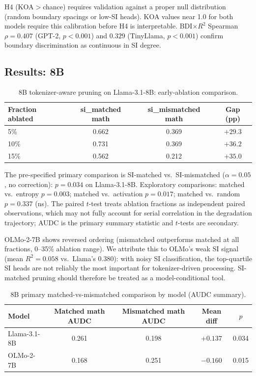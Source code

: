 \documentclass{article}
\begin{document}
H4 (KOA$>$chance) requires validation against a proper null distribution (random boundary
spacings or low-SI heads). KOA values near 1.0 for both models require this calibration
before H4 is interpretable. BDI$\times R^2$ Spearman $\rho = 0.407$ (GPT-2, $p < 0.001$)
and $0.329$ (TinyLlama, $p < 0.001$) confirm boundary discrimination as continuous in SI degree.

\subsection{Results: 8B}

\begin{table}[htbp]
    \caption{8B tokenizer-aware pruning on Llama-3.1-8B: early-ablation comparison.}
    \centering
    \small
    \begin{tabular}{lccc}
        \toprule
        Fraction ablated & si\_matched math & si\_mismatched math & Gap (pp) \\
        \midrule
        5\% & 0.662 & 0.369 & $+29.3$ \\
        10\% & 0.731 & 0.369 & $+36.2$ \\
        15\% & 0.562 & 0.212 & $+35.0$ \\
        \bottomrule
    \end{tabular}
\end{table}

The pre-specified primary comparison is SI-matched vs.\ SI-mismatched ($\alpha = 0.05$,
no correction): $p = 0.034$ on Llama-3.1-8B. Exploratory comparisons: matched vs.\ entropy
$p = 0.003$; matched vs.\ activation $p = 0.017$; matched vs.\ random $p = 0.337$ (ns). The paired
$t$-test treats ablation fractions as independent paired observations, which may not fully
account for serial correlation in the degradation trajectory; AUDC is the primary summary
statistic and $t$-tests are secondary.

OLMo-2-7B shows reversed ordering (mismatched outperforms matched at all fractions,
0--35\% ablation range). We attribute this to OLMo's weak SI signal (mean $R^2 = 0.058$
vs.\ Llama's $0.380$): with noisy SI classification, the top-quartile SI heads are not
reliably the most important for tokenizer-driven processing. SI-matched pruning should
therefore be treated as a model-conditional tool.

\begin{table}[htbp]
    \caption{8B primary matched-vs-mismatched comparison by model (AUDC summary).}
    \centering
    \small
    \begin{tabular}{lcccc}
        \toprule
        Model & Matched math AUDC & Mismatched math AUDC & Mean diff & $p$ \\
        \midrule
        Llama-3.1-8B & 0.261 & 0.198 & $+0.137$ & 0.034 \\
        OLMo-2-7B & 0.168 & 0.251 & $-0.160$ & 0.015 \\
        \bottomrule
    \end{tabular}
\end{table}
\end{document}
